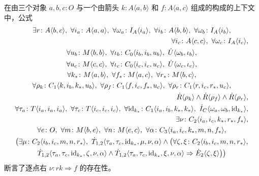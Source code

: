 \begin{example}\label{exa:right-extension-formula}
在由三个对象 $a,b,c\colon O$ 与一个由箭头 $k\colon A\langle a,b\rangle$ 和
$f\colon A\langle a,c\rangle$ 组成的\trSpan{}构成的上下文中，公式
\begin{equation*}
\begin{gathered}
\exists r\colon A\langle b,c\rangle,\ \forall i_{a}\colon A\langle a,a\rangle,\ \forall\omega_{a}\colon I_{A}\langle i_{a}\rangle,\ \forall i_{b}\colon A\langle b,b\rangle,\ \forall\omega_{b}\colon I_{A}\langle i_{b}\rangle,\\
\hfill \forall i_{c}\colon A\langle c,c\rangle,\ \forall\omega_{c}\colon I_{A}\langle i_{c}\rangle,\\
\forall u_{b}\colon M\langle b,b\rangle,\ \forall\iota_{b}\colon C_{0}\langle i_{b},i_{b},u_{b}\rangle,\ \dot{U}\langle\omega_{b},\iota_{b}\rangle,\\
\forall u_{c}\colon M\langle c,c\rangle,\ \forall\iota_{c}\colon C_{0}\langle i_{c},i_{c},u_{c}\rangle,\ \dot{U}\langle\omega_{c},\iota_{c}\rangle,\\
\forall k_{*}\colon M\langle a,b\rangle,\ \forall f_{*}\colon M\langle a,c\rangle,\ \forall r_{*}\colon M\langle b,c\rangle,\\
\forall\rho_{k}\colon C_{1}\langle k,i_{b},k_{*},u_{b}\rangle,\ \forall\rho_{f}\colon C_{1}\langle f,i_{c},f_{*},u_{c}\rangle,\ \forall\rho_{r}\colon C_{1}\langle r,i_{c},r_{*},u_{c}\rangle,\\
\hfill \dot{R}\langle\rho_{k}\rangle\wedge\dot{R}\langle\rho_{f}\rangle\wedge\dot{R}\langle\rho_{r}\rangle,\\
\forall\tau_{a}\colon T\langle i_{a},i_{a},i_{a}\rangle,\ \forall\tau_{c}\colon T\langle i_{c},i_{c},i_{c}\rangle,\ \forall\mathrm{id}_{k_{*}}\colon C_{1}\langle i_{a},i_{b},k_{*},k_{*}\rangle,\ \dot{I}_{C}\langle\omega_{a},\omega_{b},\mathrm{id}_{k_{*}}\rangle,\\
\hfill \exists\nu\colon C_{2}\langle i_{a},i_{c},k_{*},r_{*},f_{*}\rangle,\\
\forall e\colon O,\ \forall m\colon M\langle b,e\rangle,\ \forall n\colon M\langle e,c\rangle,\ \forall\alpha\colon C_{3}\langle i_{a},i_{c},k_{*},m,n,f_{*}\rangle,\\
\bigl(\exists\mu\colon C_{2}\langle i_{b},i_{c},m,n,r_{*}\rangle,\ \dot{T}_{1,2}\langle\tau_{a},\tau_{c},\mathrm{id}_{k_{*}},\mu,\nu,\alpha\rangle \wedge \bigl(\forall\zeta,\xi\colon C_{2}\langle i_{b},i_{c},m,n,r_{*}\rangle,\\
\dot{T}_{1,2}\langle\tau_{a},\tau_{c},\mathrm{id}_{k_{*}},\zeta,\nu,\alpha\rangle \wedge \dot{T}_{1,2}\langle\tau_{a},\tau_{c},\mathrm{id}_{k_{*}},\xi,\nu,\alpha\rangle \Rightarrow \dot{E}_{2}\langle\zeta,\xi\rangle\bigr)\bigr)
\end{gathered}
\end{equation*}
断言了逐点右\trExtension{} $\nu\colon rk\Rightarrow f$ 的存在性。


\end{example}
